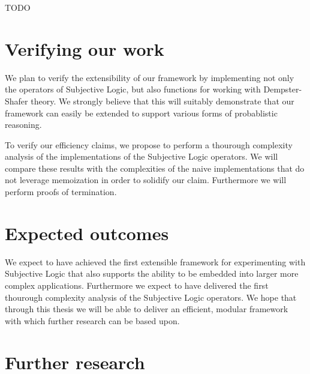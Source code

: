 \documentclass[a4paper]{article}
\begin{document}
\par
TODO

\section{Verifying our work}

\par
We plan to verify the extensibility of our framework by implementing not only the
operators of Subjective Logic, but also functions for working with Dempster-Shafer
theory. We strongly believe that this will suitably demonstrate that our framework can
easily be extended to support various forms of probablistic reasoning.

\par
To verify our efficiency claims, we propose to perform a thourough complexity analysis
of the implementations of the Subjective Logic operators. We will compare these results
with the complexities of the naive implementations that do not leverage memoization in
order to solidify our claim. Furthermore we will perform proofs of termination.

\section{Expected outcomes}

\par
We expect to have achieved the first extensible framework for experimenting with
Subjective Logic that also supports the ability to be embedded into larger more complex
applications. Furthermore we expect to have delivered the first thourough complexity
analysis of the Subjective Logic operators. We hope that through this thesis we will be
able to deliver an efficient, modular framework with which further research can be
based upon.


\section{Further research}
\end{document}
